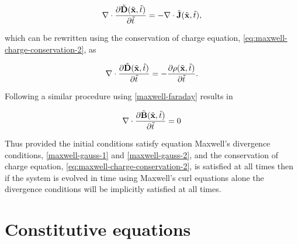 $$
\nabla \cdot \frac{\partial \tilde{\mathbf{D}}(\tilde{\mathbf{x}}, \tilde{t})}{\partial \tilde{t}} = - \nabla \cdot \tilde{\mathbf{J}}(\tilde{\mathbf{x}},\tilde{t}),
$$

which can be rewritten using the conservation of charge equation, \eqref{eq:maxwell-charge-conservation-2}, as

$$
\nabla \cdot \frac{\partial\tilde{\mathbf{D}}(\tilde{\mathbf{x}}, \tilde{t})}{\partial \tilde{t}} = - \frac{\partial \rho (\tilde{\mathbf{x}},\tilde{t})}{\partial \tilde{t}}.
$$

Following a similar procedure using \eqref{maxwell-faraday} results in

$$
\nabla \cdot \frac{\partial \tilde{\mathbf{B}}(\tilde{\mathbf{x}}, \tilde{t})}{\partial \tilde{t}} = 0
$$

Thus provided the initial conditions satisfy equation Maxwell's divergence conditions, \eqref{maxwell-gauss-1} and \eqref{maxwell-gauss-2}, and the conservation of charge equation, \eqref{eq:maxwell-charge-conservation-2}, is satisfied at all times then if the system is evolved in time using Maxwell's curl equations alone the divergence conditions will be implicitly satisfied at all times.

\section{Constitutive equations}

